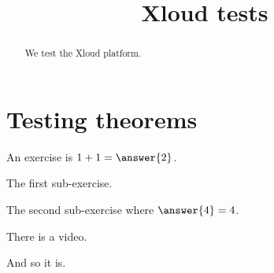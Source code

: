 \documentclass{ximera}
\title{Xloud tests}
\begin{document}
\begin{abstract}
  We test the Xloud platform.
\end{abstract}
\maketitle
 
\section{Testing theorems}

\begin{exercise}
  An exercise is $1+1 = \answer{2}$.
  
  \begin{exercise}
    The first sub-exercise.
  \end{exercise}

  \begin{exercise}
    The second sub-exercise where $\answer{4} = 4$.
  \end{exercise}  
\end{exercise}

There is a video.


And so it is.
 
\end{document}
